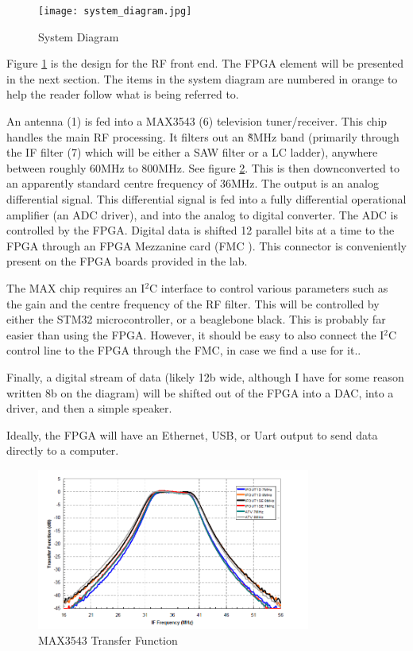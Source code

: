 \documentclass[a4paper, 12pt]{article}
\begin{document}
\begin{figure}
\caption{System Diagram}
\label{fig:system_diagram}
\centerline{\texttt{[image: system\_diagram.jpg]}}
\end{figure}

Figure \ref{fig:system_diagram} is the design for the RF front end.  The FPGA element will be presented in the next section.  The items in the system diagram are numbered in orange to help the reader follow what is being referred to.

An antenna (1) is fed into a MAX3543 (6) television tuner/receiver.  This chip handles the main RF processing.  It filters out an \~8MHz band (primarily through the IF filter (7) which will be either a SAW filter or a LC ladder), anywhere between roughly 60MHz to 800MHz.  See figure \ref{fig:transfer_function}.  This is then downconverted to an apparently standard centre frequency of 36MHz.  The output is an analog differential signal.  This differential signal is fed into a fully differential operational amplifier (an ADC driver), and into the analog to digital converter.  The ADC is controlled by the FPGA.  Digital data is shifted 12 parallel bits at a time to the FPGA through an FPGA Mezzanine card (FMC \cite{fmc}).  This connector is conveniently present on the FPGA boards provided in the lab.

The MAX chip requires an I$^2$C interface to control various parameters such as the gain and the centre frequency of the RF filter.  This will be controlled by either the STM32 microcontroller, or a beaglebone black.  This is probably far easier than using the FPGA.  However, it should be easy to also connect the I$^2$C control line to the FPGA through the FMC, in case we find a use for it..

Finally, a digital stream of data (likely 12b wide, although I have for some reason written 8b on the diagram) will be shifted out of the FPGA into a DAC, into a driver, and then a simple speaker.

Ideally, the FPGA will have an Ethernet, USB, or Uart output to send data directly to a computer.

\begin{figure}
\caption{MAX3543 Transfer Function}
\label{fig:transfer_function}
\includegraphics[width=9cm]{../../../transfer_function.png}
\end{figure}
\end{document}
